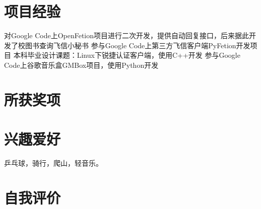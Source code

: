 \documentclass[a4paper]{moderncv}
\begin{document}
\begin{CJK*}{UTF8}{gbsn}
\section{项目经验}
{ 对Google Code上OpenFetion项目进行二次开发，提供自动回复接口，后来据此开发了校图书查询飞信小秘书 }
{ 参与Google Code上第三方飞信客户端PyFetion开发项目}
{ 本科毕业设计课题：Linux下锐捷认证客户端，使用C++开发 }
{ 参与Google Code上谷歌音乐盒GMBox项目，使用Python开发 }

\section{所获奖项}

\section{兴趣爱好}
\cvitem{}
{
\small 乒乓球，骑行，爬山，轻音乐。
}
\section{自我评价}

\closesection
\end{CJK*}
\end{document}
